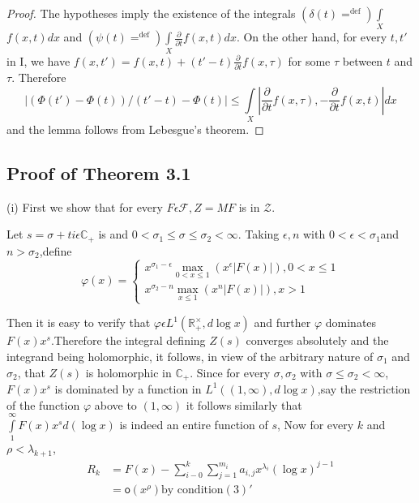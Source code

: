 \begin{proof}
  The hypotheses imply the existence of the integrals $(\delta(t)
  {\displaystyle{\mathop{=}^{\text{def}}}})\int\limits_{X}$ $f(x,t)dx$ and
  $(\psi(t){\displaystyle{\mathop{=}^{\text{def}}}})\int\limits_{X}
  \frac{\partial}{\partial  
    t}f(x,t)dx$. On the other hand, for every $t,t'$ in I, we have
  $f(x,t')=f(x,t)+(t'-t)\frac{\partial}{\partial t}f(x,\tau)$ for some
  $\tau$ between $t$ and $\tau$. Therefore 
  \begin{equation*}
    |(\Phi(t')-\Phi(t))/(t'-t)-\Phi(t)|\le\int\limits_{X}
    |\frac{\partial}{\partial t}f(x,\tau),-\frac{\partial}{\partial t}f(x,t)|dx
  \end{equation*}
  and the lemma follows from Lebesgue's theorem.
\end{proof}

\subsection{Proof of Theorem 3.1}\label{chap1:sec3:subsec3}%

(i) First we show that for every $F\epsilon \mathscr{F},Z=MF$ is in
$\mathscr{Z}$.

Let $s=\sigma + ti \epsilon \mathbb{C}_{+}$ is and $0 <
\sigma_{1}\le\sigma \le \sigma_{2}< \infty$. Taking $\epsilon,n$ with
$0<\epsilon<\sigma_{1}$and $n>\sigma_{2}$,define
\begin{equation*}
  \varphi(x)=
  \begin{cases}
    x^{\sigma_{1}-\epsilon}
    {\displaystyle{\mathop{max}_{0<x\le1}}}(x^{\epsilon}|F(x)|), 0<x\le1\\
    x^{\sigma_{2}-n}{\displaystyle{\mathop{max}_{x\le1}}}(x^{n}|F(x)|),
    x>1 
  \end{cases}
\end{equation*}

Then it is easy to verify that $\varphi \epsilon
L^{1}(\mathbb{R}_{+}^\times,d \log x)$ and further $\varphi$ dominates
$F(x)x^{s}$.Therefore the integral defining $Z(s)$ converges
absolutely and the integrand being holomorphic, it follows, in view of
the arbitrary nature of $\sigma_{1}$ and $\sigma_{2}$, that $Z(s)$ is
holomorphic in $\mathbb{C}_{+}$. Since for every $\sigma,\sigma_{2}$
with $\sigma\le\sigma_{2}<\infty$, $F(x)x^{s}$ is dominated by a
function in $L^{1}((1,\infty),d \log x)$,say the restriction of the
function $\varphi$ above to $(1,\infty)$  it follows similarly that
$\int\limits_{1}^{\infty}F(x)x^{s}d(\log x)$ is indeed an entire
function of $s$, Now for every $k$ and $\rho<\lambda_{k+1}$,
\begin{align*}
R_{k}& =F(x)-\sum\limits_{i-0}^{k} \sum\limits_{j=1}^{m_{i}}
a_{i,j}x^{\lambda_{i}}(\log x)^{j-1}\\
    & = \mathsf{o}(x^{\rho}) \text {by
  condition}(3)'\tag{7}\label{chap1:sec3:subsec3:eq7} 
\end{align*}

